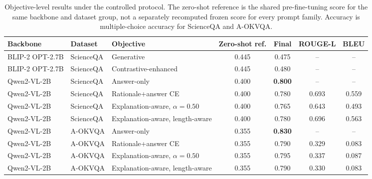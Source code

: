 \documentclass[preprint,12pt]{elsarticle}
\begin{document}
\begin{table}[!ht]
\centering
\caption{Objective-level results under the controlled protocol. The zero-shot reference is the shared pre-fine-tuning score for the same backbone and dataset group, not a separately recomputed frozen score for every prompt family. Accuracy is multiple-choice accuracy for ScienceQA and A-OKVQA.}
\label{tab:objective_comparison}
\scriptsize
\begin{adjustbox}{max width=\textwidth}
\begin{tabular}{|l|l|l|c|c|c|c|}
\hline
\textbf{Backbone} & \textbf{Dataset} & \textbf{Objective} & \textbf{Zero-shot ref.} & \textbf{Final} & \textbf{ROUGE-L} & \textbf{BLEU} \\ \hline
BLIP-2 OPT-2.7B & ScienceQA & Generative & 0.445 & 0.475 & -- & -- \\
BLIP-2 OPT-2.7B & ScienceQA & Contrastive-enhanced & 0.445 & 0.480 & -- & -- \\
Qwen2-VL-2B & ScienceQA & Answer-only & 0.400 & \textbf{0.800} & -- & -- \\
Qwen2-VL-2B & ScienceQA & Rationale+answer CE & 0.400 & 0.780 & 0.693 & 0.559 \\
Qwen2-VL-2B & ScienceQA & Explanation-aware, $\alpha=0.50$ & 0.400 & 0.765 & 0.643 & 0.493 \\
Qwen2-VL-2B & ScienceQA & Explanation-aware, length-aware & 0.400 & 0.780 & 0.696 & 0.563 \\
Qwen2-VL-2B & A-OKVQA & Answer-only & 0.355 & \textbf{0.830} & -- & -- \\
Qwen2-VL-2B & A-OKVQA & Rationale+answer CE & 0.355 & 0.790 & 0.329 & 0.083 \\
Qwen2-VL-2B & A-OKVQA & Explanation-aware, $\alpha=0.50$ & 0.355 & 0.795 & 0.337 & 0.087 \\
Qwen2-VL-2B & A-OKVQA & Explanation-aware, length-aware & 0.355 & 0.790 & 0.330 & 0.083 \\ \hline
\end{tabular}
\end{adjustbox}
\end{table}
\end{document}
